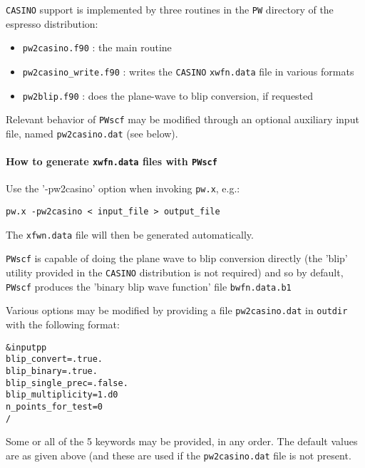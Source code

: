\documentclass[12pt,a4paper]{article}
\def\pwx{\texttt{pw.x}}
\begin{document}
\texttt{CASINO} support is implemented by three routines in the \texttt{PW} directory of the
espresso distribution: 
\begin{itemize}
\item \texttt{pw2casino.f90} : the main routine     
\item \texttt{pw2casino\_write.f90} : writes the \texttt{CASINO} \texttt{xwfn.data} file in various formats
\item \texttt{pw2blip.f90} : does the plane-wave to blip conversion, if requested
\end{itemize}
Relevant behavior of \texttt{PWscf} may be modified through an optional auxiliary input 
file, named \texttt{pw2casino.dat} (see below).

\paragraph{How to generate \texttt{xwfn.data} files with \texttt{PWscf}}
Use the '-pw2casino' option when invoking \pwx, e.g.: 
\begin{verbatim}
pw.x -pw2casino < input_file > output_file
\end{verbatim}
The \texttt{xfwn.data} file will then be generated automatically. 

\texttt{PWscf} is capable of doing the plane wave to blip conversion directly (the
'blip' utility provided in the \texttt{CASINO} distribution is not required) and so by
default, \texttt{PWscf} produces the 'binary blip wave function' file \texttt{bwfn.data.b1}

Various options may be modified by providing a file \texttt{pw2casino.dat} in \texttt{outdir}
with the following format: 
\begin{verbatim}
&inputpp
blip_convert=.true.
blip_binary=.true.
blip_single_prec=.false.
blip_multiplicity=1.d0
n_points_for_test=0
/
\end{verbatim}
Some or all of the 5 keywords may be provided, in any order. The default
values are as given above (and these are used if the \texttt{pw2casino.dat} file is
not present.
\end{document}
